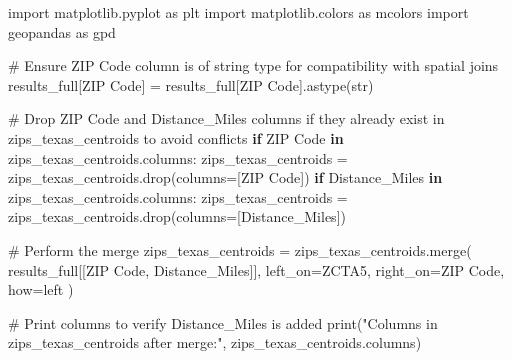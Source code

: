 \documentclass[
  letterpaper,
  DIV=11,
  numbers=noendperiod]{scrartcl}
\newenvironment{Shaded}{\begin{snugshade}}{\end{snugshade}}
\newcommand{\BuiltInTok}[1]{\textcolor[rgb]{0.00,0.23,0.31}{#1}}
\newcommand{\CommentTok}[1]{\textcolor[rgb]{0.37,0.37,0.37}{#1}}
\newcommand{\ControlFlowTok}[1]{\textcolor[rgb]{0.00,0.23,0.31}{\textbf{#1}}}
\newcommand{\ImportTok}[1]{\textcolor[rgb]{0.00,0.46,0.62}{#1}}
\newcommand{\KeywordTok}[1]{\textcolor[rgb]{0.00,0.23,0.31}{\textbf{#1}}}
\newcommand{\NormalTok}[1]{\textcolor[rgb]{0.00,0.23,0.31}{#1}}
\newcommand{\OperatorTok}[1]{\textcolor[rgb]{0.37,0.37,0.37}{#1}}
\newcommand{\StringTok}[1]{\textcolor[rgb]{0.13,0.47,0.30}{#1}}
\begin{document}
\begin{Shaded}
\begin{Highlighting}[]
\ImportTok{import}\NormalTok{ matplotlib.pyplot }\ImportTok{as}\NormalTok{ plt}
\ImportTok{import}\NormalTok{ matplotlib.colors }\ImportTok{as}\NormalTok{ mcolors}
\ImportTok{import}\NormalTok{ geopandas }\ImportTok{as}\NormalTok{ gpd}

\CommentTok{\# Ensure \textquotesingle{}ZIP Code\textquotesingle{} column is of string type for compatibility with spatial joins}
\NormalTok{results\_full[}\StringTok{\textquotesingle{}ZIP Code\textquotesingle{}}\NormalTok{] }\OperatorTok{=}\NormalTok{ results\_full[}\StringTok{\textquotesingle{}ZIP Code\textquotesingle{}}\NormalTok{].astype(}\BuiltInTok{str}\NormalTok{)}

\CommentTok{\# Drop \textquotesingle{}ZIP Code\textquotesingle{} and \textquotesingle{}Distance\_Miles\textquotesingle{} columns if they already exist in zips\_texas\_centroids to avoid conflicts}
\ControlFlowTok{if} \StringTok{\textquotesingle{}ZIP Code\textquotesingle{}} \KeywordTok{in}\NormalTok{ zips\_texas\_centroids.columns:}
\NormalTok{    zips\_texas\_centroids }\OperatorTok{=}\NormalTok{ zips\_texas\_centroids.drop(columns}\OperatorTok{=}\NormalTok{[}\StringTok{\textquotesingle{}ZIP Code\textquotesingle{}}\NormalTok{])}
\ControlFlowTok{if} \StringTok{\textquotesingle{}Distance\_Miles\textquotesingle{}} \KeywordTok{in}\NormalTok{ zips\_texas\_centroids.columns:}
\NormalTok{    zips\_texas\_centroids }\OperatorTok{=}\NormalTok{ zips\_texas\_centroids.drop(columns}\OperatorTok{=}\NormalTok{[}\StringTok{\textquotesingle{}Distance\_Miles\textquotesingle{}}\NormalTok{])}

\CommentTok{\# Perform the merge}
\NormalTok{zips\_texas\_centroids }\OperatorTok{=}\NormalTok{ zips\_texas\_centroids.merge(}
\NormalTok{    results\_full[[}\StringTok{\textquotesingle{}ZIP Code\textquotesingle{}}\NormalTok{, }\StringTok{\textquotesingle{}Distance\_Miles\textquotesingle{}}\NormalTok{]], }
\NormalTok{    left\_on}\OperatorTok{=}\StringTok{\textquotesingle{}ZCTA5\textquotesingle{}}\NormalTok{, right\_on}\OperatorTok{=}\StringTok{\textquotesingle{}ZIP Code\textquotesingle{}}\NormalTok{, how}\OperatorTok{=}\StringTok{\textquotesingle{}left\textquotesingle{}}
\NormalTok{)}

\CommentTok{\# Print columns to verify \textquotesingle{}Distance\_Miles\textquotesingle{} is added}
\BuiltInTok{print}\NormalTok{(}\StringTok{"Columns in zips\_texas\_centroids after merge:"}\NormalTok{, zips\_texas\_centroids.columns)}


\end{Highlighting}
\end{Shaded}
\end{document}
